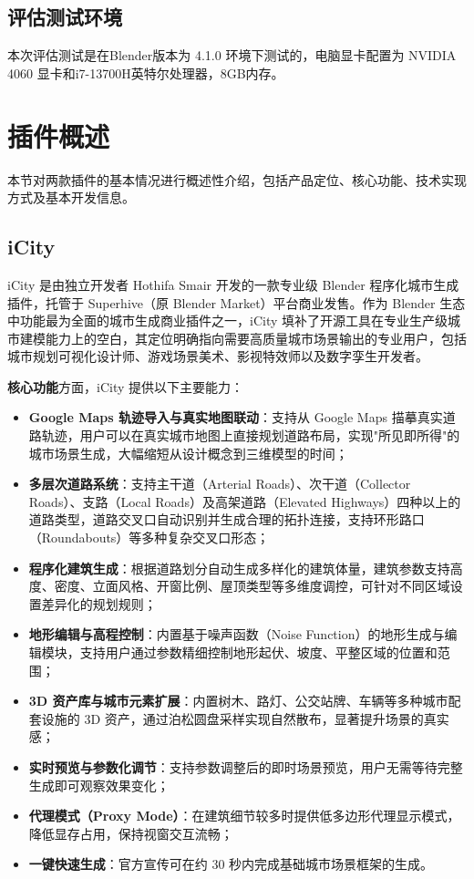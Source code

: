 \documentclass[UTF8,a4paper,10pt]{ctexart}
\begin{document}
\subsection{评估测试环境}
本次评估测试是在Blender版本为 4.1.0 环境下测试的，电脑显卡配置为 NVIDIA 4060 显卡和i7-13700H英特尔处理器，8GB内存。

\section{插件概述}

本节对两款插件的基本情况进行概述性介绍，包括产品定位、核心功能、技术实现方式及基本开发信息。

\subsection{iCity}

iCity 是由独立开发者 Hothifa Smair 开发的一款专业级 Blender 程序化城市生成插件，托管于 Superhive（原 Blender Market）平台商业发售。作为 Blender 生态中功能最为全面的城市生成商业插件之一，iCity 填补了开源工具在专业生产级城市建模能力上的空白，其定位明确指向需要高质量城市场景输出的专业用户，包括城市规划可视化设计师、游戏场景美术、影视特效师以及数字孪生开发者。

\textbf{核心功能}方面，iCity 提供以下主要能力：
\begin{itemize}
    \item \textbf{Google Maps 轨迹导入与真实地图联动}：支持从 Google Maps 描摹真实道路轨迹，用户可以在真实城市地图上直接规划道路布局，实现"所见即所得"的城市场景生成，大幅缩短从设计概念到三维模型的时间；
    \item \textbf{多层次道路系统}：支持主干道（Arterial Roads）、次干道（Collector Roads）、支路（Local Roads）及高架道路（Elevated Highways）四种以上的道路类型，道路交叉口自动识别并生成合理的拓扑连接，支持环形路口（Roundabouts）等多种复杂交叉口形态；
    \item \textbf{程序化建筑生成}：根据道路划分自动生成多样化的建筑体量，建筑参数支持高度、密度、立面风格、开窗比例、屋顶类型等多维度调控，可针对不同区域设置差异化的规划规则；
    \item \textbf{地形编辑与高程控制}：内置基于噪声函数（Noise Function）的地形生成与编辑模块，支持用户通过参数精细控制地形起伏、坡度、平整区域的位置和范围；
    \item \textbf{3D 资产库与城市元素扩展}：内置树木、路灯、公交站牌、车辆等多种城市配套设施的 3D 资产，通过泊松圆盘采样实现自然散布，显著提升场景的真实感；
    \item \textbf{实时预览与参数化调节}：支持参数调整后的即时场景预览，用户无需等待完整生成即可观察效果变化；
    \item \textbf{代理模式（Proxy Mode）}：在建筑细节较多时提供低多边形代理显示模式，降低显存占用，保持视窗交互流畅；
    \item \textbf{一键快速生成}：官方宣传可在约 30 秒内完成基础城市场景框架的生成。
\end{itemize}
\end{document}
